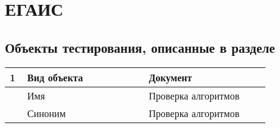 \section{ЕГАИС}
\subsection{Объекты тестирования, описанные в разделе}

\begin{longtable}{p{0.05\linewidth}p{0.4\linewidth}p{0.4\linewidth}}
    \hline
    1 & Вид объекта & Документ \\
    \hline
    & Имя & Проверка алгоритмов \\
    \hline
    & Синоним  & Проверка алгоритмов \\
    \hline

    \bottomrule %
\end{longtable}

